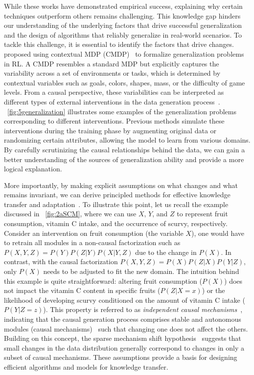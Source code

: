 \documentclass[10pt]{article} %
\theoremstyle{definition}
\begin{document}
While these works have demonstrated empirical success, explaining why certain techniques outperform others remains challenging. This knowledge gap hinders our understanding of the underlying factors that drive successful generalization and the design of algorithms that reliably generalize in real-world scenarios.  To tackle this challenge, it is essential to identify the factors that drive changes. \citet{kirkSurveyGeneralisationDeep2022} proposed using contextual MDP (CMDP)~\citep{hallakContextualMarkovDecision2015} to formalize generalization problems in RL. A CMDP resembles a standard MDP but explicitly captures the variability across a set of environments or tasks, which is determined by contextual variables such as goals, colors, shapes, mass, or the difficulty of game levels.  From a causal perspective, these variabilities can be interpreted as different types of external interventions in the data generation process~\citep{scholkopfCausalRepresentationLearning2021a,thamsCausality2022}. \figurename~\ref{fig:5generalization} illustrates some examples of the generalization problems corresponding to different interventions. Previous methods simulate these interventions during the training phase by augmenting original data or randomizing certain attributes, allowing the model to learn from various domains. By carefully scrutinizing the causal relationships behind the data, we can gain a better understanding of the sources of generalization ability and provide a more logical explanation. 

More importantly, by making explicit assumptions on what changes and what remains invariant, we can derive principled methods for effective knowledge transfer and adaptation~\citep{zhangMultisourceDomainAdaptation2015,gongDomainAdaptationConditional2016}. 
To illustrate this point, let us recall the example discussed in \figurename~\ref{fig:2aSCM}, where we can use $X$, $Y$, and $Z$ to represent fruit consumption, vitamin C intake, and the occurrence of scurvy, respectively. 
Consider an intervention on fruit consumption (the variable $X$), one would have to retrain all modules in a non-causal factorization such as $P(X, Y, Z)=P(Y)P(Z|Y)P(X|Y, Z)$ due to the change in $P(X)$. In contrast, with the causal factorization $P(X, Y, Z)=P(X)P(Z|X)P(Y|Z)$, only $P(X)$ needs to be adjusted to fit the new domain. 
The intuition behind this example is quite straightforward: altering fruit consumption ($P(X)$) does not impact the vitamin C content in specific fruits ($P(Z|X=x)$) or the likelihood of developing scurvy conditioned on the amount of vitamin C intake ($P(Y|Z=z)$). 
This property is referred to as \emph{independent causal mechanisms}~\citep{scholkopfCausalRepresentationLearning2021a}, indicating that the causal generation process comprises stable and autonomous modules (causal mechanisms)~\citep[Chapter~2]{pearlCausality2009} such that changing one does not affect the others. 
Building on this concept, the sparse mechanism shift hypothesis~\citep{scholkopfCausalRepresentationLearning2021a,perryCausalDiscoveryHeterogeneous2022} suggests that small changes in the data distribution generally correspond to changes in only a subset of causal mechanisms. 
These assumptions provide a basis for designing efficient algorithms and models for knowledge transfer.
\end{document}
